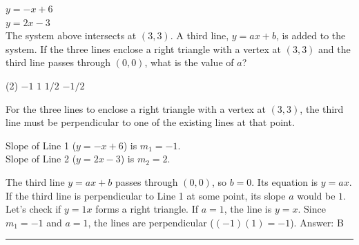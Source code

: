\documentclass[11pt,paper=a4,answers]{exam}
\begin{document}
\begin{questions}
\question
\begin{center}
\end{center}
$y = -x + 6$ \\
$y = 2x - 3$ \\
The system above intersects at $(3, 3)$. A third line, $y = ax + b$, is added to the system. If the three lines enclose a right triangle with a vertex at $(3, 3)$ and the third line passes through $(0, 0)$, what is the value of $a$?
\begin{tasks}(2)
\task $-1$ \task $1$ \task $1/2$ \task $-1/2$
\end{tasks}

\begin{solution}
For the three lines to enclose a right triangle with a vertex at $(3, 3)$, the third line must be perpendicular to one of the existing lines at that point.
\vspace{5pt}

\begin{center}
Slope of Line 1 ($y = -x + 6$) is $m_1 = -1$. \\
Slope of Line 2 ($y = 2x - 3$) is $m_2 = 2$. 
\end{center}
\vspace{5pt}
The third line $y = ax + b$ passes through $(0, 0)$, so $b = 0$. Its equation is $y = ax$.
\vspace{5pt}
If the third line is perpendicular to Line 1 at some point, its slope $a$ would be $1$. 
\vspace{5pt}
Let's check if $y = 1x$ forms a right triangle. If $a=1$, the line is $y=x$. Since $m_1 = -1$ and $a = 1$, the lines are perpendicular ($(-1)(1) = -1$).
\vspace{5pt}
Answer: \colorbox{yellow!100}{B}
\end{solution}

\end{questions}
\begin{center}
\rule{.5\textwidth}{1pt}
\end{center}
\end{document}
